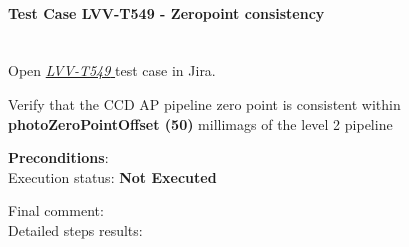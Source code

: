 \documentclass[DM,lsstdraft,STR,toc]{lsstdoc}
\begin{document}
\paragraph{Test Case LVV-T549 - Zeropoint consistency
 }\mbox{}\\

Open  \href{https://jira.lsstcorp.org/secure/Tests.jspa#/testCase/LVV-T549}{\textit{ LVV-T549 } }
test case in Jira.

Verify that the CCD AP pipeline zero point is consistent within
\textbf{photoZeroPointOffset (50)} millimags of the level 2 pipeline


\textbf{ Preconditions}:\\


Execution status: {\bf Not Executed }

Final comment:\\


Detailed steps results:
\end{document}
